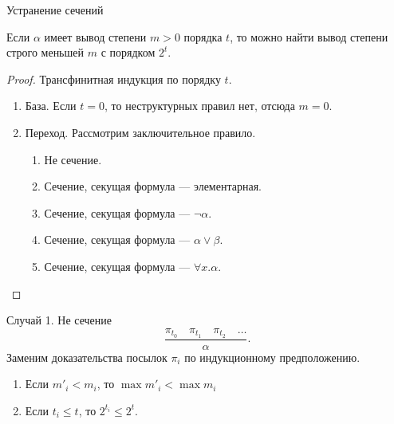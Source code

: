 {Устранение сечений}
\begin{theorem}Если $\alpha$ имеет вывод степени $m>0$ порядка $t$, то
можно найти вывод степени строго меньшей $m$ с порядком $2^t$.
\end{theorem}

\begin{proof}Трансфинитная индукция по порядку $t$.\begin{enumerate}
\item База. Если $t=0$, то неструктурных правил нет, отсюда $m = 0$.
\item Переход. Рассмотрим заключительное правило.
\begin{enumerate}
\item Не сечение.
\item Сечение, секущая формула --- элементарная.
\item Сечение, секущая формула --- $\neg\alpha$.
\item Сечение, секущая формула --- $\alpha\vee\beta$.
\item Сечение, секущая формула --- $\forall x.\alpha$.
\end{enumerate}
\end{enumerate}
\end{proof}


{Случай 1. Не сечение}
\[\dfrac{\pi_{t_0}\quad\pi_{t_1}\quad\pi_{t_2}\quad\dots}{\alpha}.\]
Заменим доказательства посылок $\pi_i$ по индукционному предположению.

\begin{enumerate}
\item Если $m'_i < m_i$, то $\max m'_i < \max m_i$
\item Если $t_i \le t$, то $2^{t_i} \le 2^t$.
\end{enumerate}


